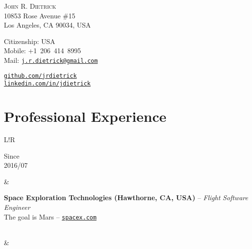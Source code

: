 \documentclass[10pt]{article}
\makeatletter
\newcommand\VRule{\color{lightgray}\vrule width 0.5pt}
\def\spaceBetweenSections{\vspace{-10pt}}
\def\spaceBetweenExperienceEntries{\vspace{8pt}&\vspace{8pt}\\}
\def\fullName{John R. Dietrick}
\def\englishAddressLineOne{10853 Rose Avenue \#15}
\def\englishAddressLineTwo{Los Angeles, CA 90034, USA}
\def\chineseAddress{}
\def\citizenship{USA}
\def\mobileNumber{+1~206~414~8995}
\def\emailAddress{j.r.dietrick@gmail.com}
\makeatother
\begin{document}
\begin{CJK}{UTF8}{gbsn}

\vspace{0pt}
\begin{center}
    \flushleft
    \begin{minipage}[b]{0.42\linewidth}
        \vspace{0pt}
        {\huge\textsc{\fullName}}\\
        \englishAddressLineOne\\
        \englishAddressLineTwo
        \ifx\USAVERSION\undefined
            \\\chineseAddress
        \fi
    \end{minipage}
    \begin{minipage}[b]{0.32\linewidth}
        \vspace{0pt}
        Citizenship: \citizenship\\
        Mobile: \mobileNumber\\
        Mail: \texttt{\small\href{mailto:\emailAddress}{\emailAddress}}
    \end{minipage}
    \begin{minipage}[b]{0.24\linewidth}
        \vspace{0pt}
        \texttt{\small\href{https://github.com/jrdietrick}{github.com/jrdietrick}}\\
        \texttt{\small\href{https://linkedin.com/in/jdietrick}{linkedin.com/in/jdietrick}}
    \end{minipage}
\end{center}

\spaceBetweenSections

\section*{Professional Experience}
\begin{tabular}{L!{\VRule}R}
    \parbox[t]{1.0\linewidth}{
        {\scriptsize Since}\\
        {\scriptsize 2016/07}
    }&
    \parbox[t]{1.0\linewidth}{
        {\bf Space Exploration Technologies (Hawthorne, CA, USA)} -- \textit{Flight Software Engineer}\\
        The goal is Mars -- \texttt{\small\href{http://www.spacex.com}{spacex.com}}\\
    }\\

    \spaceBetweenExperienceEntries


\end{tabular}
\end{CJK}
\end{document}
